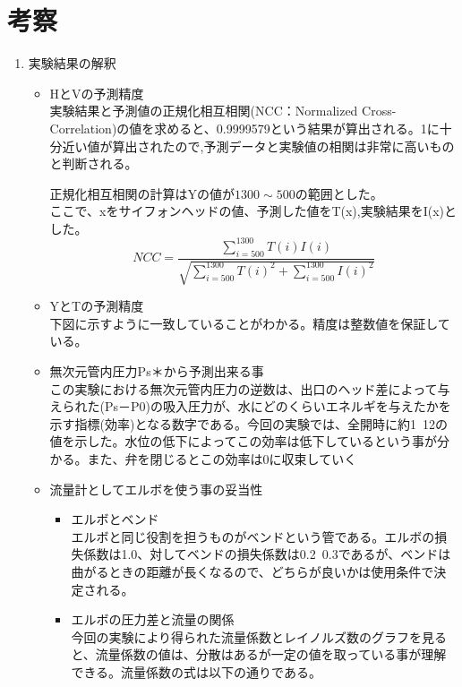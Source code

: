 \documentclass[a4j,twoside,openright,11pt]{jarticle}
\begin{document}
\section{考察}
\begin{enumerate}
\item 実験結果の解釈
\begin{itemize}
\item HとVの予測精度\\
実験結果と予測値の正規化相互相関(NCC：Normalized Cross-Correlation)の値を求めると、0.9999579という結果が算出される。1に十分近い値が算出されたので,予測データと実験値の相関は非常に高いものと判断される。\\
\par
正規化相互相関の計算はYの値が$1300\sim500$の範囲とした。\\
ここで、xをサイフォンヘッドの値、予測した値をT(x),実験結果をI(x)とした。\\
\begin{equation}
NCC=\frac{\sum_{i=500}^{1300}T(i)I(i)}{\sqrt{\sum_{i=500}^{1300}T(i)^2+\sum_{i=500}^{1300}I(i)^2}}
\end{equation}
\item YとTの予測精度\\
下図に示すように一致していることがわかる。精度は整数値を保証している。


\item 無次元管内圧力Ps＊から予測出来る事\\
この実験における無次元管内圧力の逆数は、出口のヘッド差によって与えられた(Ps－P0)の吸入圧力が、水にどのくらいエネルギを与えたかを示す指標(効率)となる数字である。今回の実験では、全開時に約1~12の値を示した。水位の低下によってこの効率は低下しているという事が分かる。また、弁を閉じるとこの効率は0に収束していく
\item 流量計としてエルボを使う事の妥当性\\
\begin{itemize}
\item エルボとベンド\\
エルボと同じ役割を担うものがベンドという管である。エルボの損失係数は1.0、対してベンドの損失係数は0.2~0.3であるが、ベンドは曲がるときの距離が長くなるので、どちらが良いかは使用条件で決定される。
\item エルボの圧力差と流量の関係\\
今回の実験により得られた流量係数とレイノルズ数のグラフを見ると、流量係数の値は、分散はあるが一定の値を取っている事が理解できる。流量係数の式は以下の通りである。


\end{itemize}
\end{itemize}
\end{enumerate}
\end{document}
